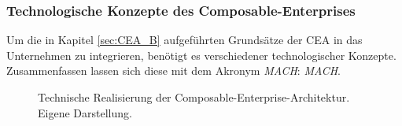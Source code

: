 \subsubsection{Technologische Konzepte des Composable-Enterprises}
Um die in Kapitel \ref{sec:CEA_B} aufgeführten Grundsätze der CEA in das Unternehmen zu integrieren, benötigt es verschiedener technologischer Konzepte. Zusammenfassen lassen sich diese mit dem Akronym \textit{MACH}: \textit{\acl{MACH}}.
\begin{center}
	\begin{figure}[H]
		\centering
		\caption[Technische Realisierung der Composable-Enterprise-Architektur]{Technische Realisierung der Composable-Enterprise-Archi\-tektur. Eigene Darstellung.}
		\label{fig:CEA_K}
	\end{figure}	
\end{center}
\vspace*{-15mm}
